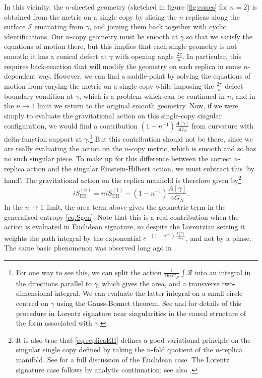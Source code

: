 \documentclass[letterpaper,12pt]{article}
\newcommand*{\island}{\mathcal{I}}
\begin{document}
In this vicinity, the $n$-sheeted geometry (sketched in figure \ref{fig:cones} for $n=2$) is obtained from the metric on a single copy by slicing the $n$ replicas along the surface $\island$ emanating from $\gamma$, and joining them back together with cyclic identifications. Our $n$-copy geometry must be smooth at $\gamma$ so that we satisfy the equations of motion there, but this implies that each single geometry is not smooth: it has a conical defect at $\gamma$ with opening angle $\frac{2\pi}{n}$. In particular, this requires back-reaction that will modify the geometry on each replica in some $n$-dependent way. However, we can find a saddle-point by solving the equations of motion from varying the metric on a single copy while imposing the $\frac{2\pi}{n}$ defect boundary condition at $\gamma$, which is a problem which can be continued in $n$, and in the $n\to 1$ limit we return to the original smooth geometry. Now, if we were simply to evaluate the gravitational action on this single-copy singular configuration, we would find a contribution $(1-n^{-1})\frac{A[\gamma]}{4G_N}$ from curvature with delta-function support at $\gamma$.\footnote{For one way to see this, we can split the action $\frac{1}{16\pi G_N}\int \mathcal{R}$ into an integral in the directions parallel to $\gamma$, which gives the area, and a transverse two-dimensional integral. We can evaluate the latter integral on a small circle centred on $\gamma$ using the Gauss-Bonnet theorem. See \cite{Louko:1995jw} and \cite{CDMRW} for details of this procedure in Lorentz signature near singularities in the causal structure of the form associated with $\gamma$.} But this contribution should not be there, since we are really evaluating the action on the $n$-copy metric, which is smooth and so has no such singular piece. To make up for this difference between the correct $n$-replica action and the singular Einstein-Hilbert action, we must subtract this `by hand'. The gravitational action on the replica manifold is therefore given \cite{Lewkowycz:2013nqa,Dong:2016hjy} by\footnote{It is also true that \eqref{eq:replicaEH} defines a good variational principle on the singular single copy defined by taking the $n$-fold quotient of the $n$-replica manifold.  See \cite{Dong:2019piw} for a full discussion of the Euclidean case.  The Lorentz signature case follows by analytic continuation; see also \cite{CDMRW}.}
\begin{equation}\label{eq:replicaEH}
	i S_\mathrm{EH}^{(n)} = n i S_\mathrm{EH}^{(1)} - (1-n^{-1})\frac{A[\gamma]}{4G_N}.
\end{equation}
 In the $n\to 1$ limit, the area term above gives the geometric term in the generalised entropy \eqref{eq:Sgen}. Note that this is a real contribution when the action is evaluated in Euclidean signature, so despite the Lorentzian setting it weights the path integral by the exponential $e^{-(1-n^{-1})\frac{A[\gamma]}{4G_N}}$, and not by a phase.  The same basic phenomenon was observed long ago in \cite{Louko:1995jw}.
\end{document}
